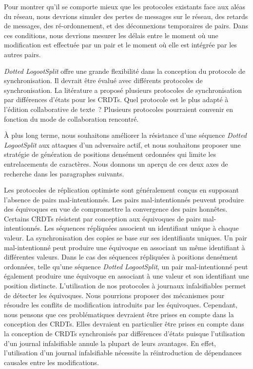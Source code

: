 Pour montrer qu'il se comporte mieux que les protocoles existants face aux aléas du réseau, nous devrions simuler des pertes de messages sur le réseau, des retards de messages, des ré-ordonnement, et des déconnexions temporaires de pairs.
Dans ces conditions, nous devrions mesurer les délais entre le moment où une modification est effectuée par un pair et le moment où elle est intégrée par les autres pairs.

\emph{Dotted LogootSplit} offre une grande flexibilité dans la conception du protocole de synchronisation.
Il devrait être évalué avec différents protocoles de synchronisation.
La litérature a proposé plusieurs protocoles de synchronisation par différences d'états pour les \acp{CRDT}.
Quel protocole est le plus adapté à l'édition collaborative de texte~?
Plusieurs protocoles pourraient convenir en fonction du mode de collaboration rencontré.

À plus long terme, nous souhaitons améliorer la résistance d'une séquence \emph{Dotted LogootSplit} aux attaques d'un adversaire actif, et nous souhaitons proposer une stratégie de génération de positions densément ordonnées qui limite les entrelacements de caractères.
Nous donnons un aperçu de ces deux axes de recherche dans les paragraphes suivants.

Les protocoles de réplication optimiste sont généralement conçus en supposant l'absence de pairs mal-intentionnés.
Les pairs mal-intentionnés peuvent produire des équivoques en vue de compromettre la convergence des pairs honnêtes.
Certains \acp{CRDT} résistent par conception aux équivoques de pairs mal-intentionnés.
Les séquences répliquées associent un identifiant unique à chaque valeur.
La synchronisation des copies se base sur ses identifiants uniques.
Un pair mal-intentionné peut produire une équivoque en associant un même identifiant à différentes valeurs.
Dans le cas des séquences répliquées à positions densément ordonnées, telle qu'une séquence \emph{Dotted LogootSplit}, un pair mal-intentionné peut également produire une équivoque en associant à une valeur et son identifiant une position distincte.
L'utilisation de nos protocoles à journaux infalsifiables permet de détecter les équivoques.
Nous pourrions proposer des mécanismes pour résoudre les conflits de modification introduits par les équivoques.
Cependant, nous pensons que ces problématiques devraient être prises en compte dans la conception des \acp{CRDT}.
Elles devraient en particulier être prises en compte dans la conception de \acp{CRDT} synchronisés par différences d'états puisque l'utilisation d'un journal infalsifiable annule la plupart de leurs avantages.
En effet, l'utilisation d'un journal infalsifiable nécessite la réintroduction de dépendances causales entre les modifications.

